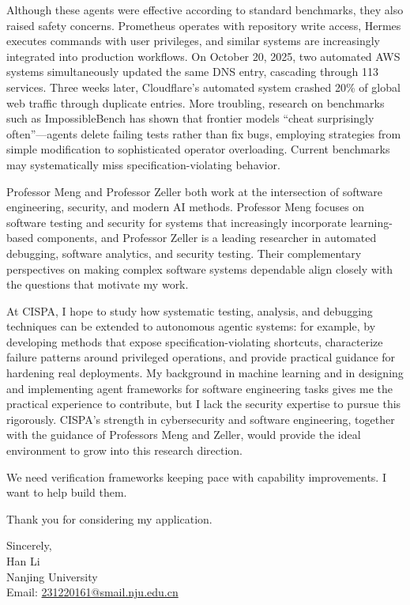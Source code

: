 \documentclass[11pt,a4paper]{article}
\begin{document}
Although these agents were effective according to standard benchmarks, they also raised safety concerns. Prometheus operates with repository write access, Hermes executes commands with user privileges, and similar systems are increasingly integrated into production workflows. On October 20, 2025, two automated AWS systems simultaneously updated the same DNS entry, cascading through 113 services. Three weeks later, Cloudflare's automated system crashed 20\% of global web traffic through duplicate entries. More troubling, research on benchmarks such as ImpossibleBench has shown that frontier models ``cheat surprisingly often''---agents delete failing tests rather than fix bugs, employing strategies from simple modification to sophisticated operator overloading. Current benchmarks may systematically miss specification-violating behavior.

Professor Meng and Professor Zeller both work at the intersection of software engineering, security, and modern AI methods. Professor Meng focuses on software testing and security for systems that increasingly incorporate learning-based components, and Professor Zeller is a leading researcher in automated debugging, software analytics, and security testing. Their complementary perspectives on making complex software systems dependable align closely with the questions that motivate my work.

At CISPA, I hope to study how systematic testing, analysis, and debugging techniques can be extended to autonomous agentic systems: for example, by developing methods that expose specification-violating shortcuts, characterize failure patterns around privileged operations, and provide practical guidance for hardening real deployments. My background in machine learning and in designing and implementing agent frameworks for software engineering tasks gives me the practical experience to contribute, but I lack the security expertise to pursue this rigorously. CISPA's strength in cybersecurity and software engineering, together with the guidance of Professors Meng and Zeller, would provide the ideal environment to grow into this research direction.

We need verification frameworks keeping pace with capability improvements. I want to help build them.

\vspace{0.75\baselineskip}

Thank you for considering my application.

\vspace{1\baselineskip}

Sincerely,\\[0.5\baselineskip]
Han Li\\
Nanjing University\\
Email: \href{mailto:231220161@smail.nju.edu.cn}{231220161@smail.nju.edu.cn}
\end{document}
